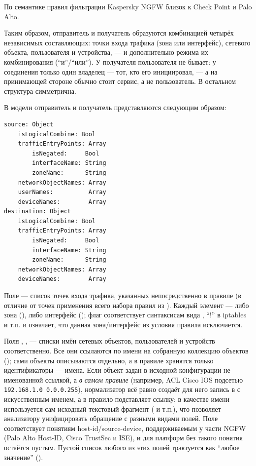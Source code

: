 По семантике правил фильтрации Kaspersky NGFW близок к Check Point и Palo Alto.

Таким образом, отправитель и получатель образуются комбинацией четырёх независимых составляющих: точки входа трафика (зона или интерфейс), сетевого объекта, пользователя и устройства, --- и дополнительно режима их комбинирования (``и''/``или''). У получателя пользователя не бывает: у соединения только один владелец --- тот, кто его инициировал, --- а на принимающей стороне обычно стоит сервис, а не пользователь. В остальном структура симметрична.

В модели отправитель и получатель представляются следующим образом:

\begin{lstlisting}[style=schemastyle]
source: Object
    isLogicalCombine: Bool
    trafficEntryPoints: Array
        isNegated:     Bool
        interfaceName: String
        zoneName:      String
    networkObjectNames: Array
    userNames:          Array
    deviceNames:        Array
destination: Object
    isLogicalCombine: Bool
    trafficEntryPoints: Array
        isNegated:     Bool
        interfaceName: String
        zoneName:      String
    networkObjectNames: Array
    deviceNames:        Array
\end{lstlisting}

Поле  --- список точек входа трафика, указанных непосредственно в правиле (в отличие от точек применения всего набора правил из ). Каждый элемент --- либо зона (), либо интерфейс (); флаг  соответствует синтаксисам вида , ``!'' в iptables и т.п. и означает, что данная зона/интерфейс из условия правила исключается.

Поля , ,  --- списки имён сетевых объектов, пользователей и устройств соответственно. Все они ссылаются по имени на собранную коллекцию объектов (); сами объекты описываются отдельно, а в правиле хранятся только идентификаторы --- имена. Если объект задан в исходной конфигурации не именованной ссылкой, а \emph{в самом правиле} (например, ACL Cisco IOS подсетью \texttt{192.168.1.0 0.0.0.255}), нормализатор всё равно создаёт для него запись в  с искусственным именем, а в правило подставляет ссылку; в качестве имени используется сам исходный текстовый фрагмент ( и т.п.), что позволяет анализатору унифицировать обращение с разными видами полей. Поле  соответствует понятиям host-id/source-device, поддерживаемым у части NGFW (Palo Alto Host-ID, Cisco TrustSec и ISE), и для платформ без такого понятия остаётся пустым. Пустой список любого из этих полей трактуется как ``любое значение'' ().

